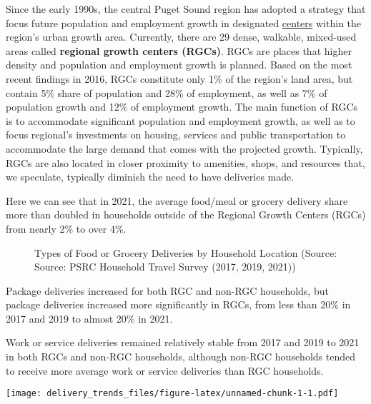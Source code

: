 \documentclass[
  11pt,
]{article}
\begin{document}
\begin{flushleft}
Since the early 1990s, the central Puget Sound region has adopted a strategy that focus future population and employment growth in designated \href{https://www.psrc.org/our-work/centers}{centers} within the region's urban growth area. Currently, there are 29 dense, walkable, mixed-used areas called  \textbf{regional growth centers (RGCs)}. RGCs are places that higher density and population and employment growth is planned. Based on the most recent findings in 2016, RGCs constitute only 1\% of the region's land area, but contain 5\% share of population and 28\% of employment, as well as 7\% of population growth and 12\% of employment growth. The main function of RGCs is to accommodate significant population and employment growth, as well as to focus regional's investments on housing, services and public transportation to accommodate the large demand that comes with the projected growth. Typically, RGCs are also located in closer proximity to amenities, shops, and resources that, we speculate, typically diminish the need to have deliveries made.

Here we can see that in 2021, the average food/meal or grocery delivery share more than doubled in households
outside of the Regional Growth Centers (RGCs) from nearly 2\% to over 4\%.
\end{flushleft}

\begin{figure}[H]
\caption{Types of Food or Grocery Deliveries by Household Location (Source: Source: PSRC Household Travel Survey (2017, 2019, 2021))}\label{fig:rgc}
\end{figure}

\begin{flushleft}
Package deliveries increased for both RGC and non-RGC households, but package deliveries increased
more significantly in RGCs, from less than 20\% in 2017 and 2019 to almost 20\% in 2021.

Work or service deliveries remained relatively stable from 2017 and 2019 to 2021 in both RGCs and non-RGC households, 
although non-RGC households tended to receive more average work or service deliveries than RGC households.
\end{flushleft}

\texttt{[image: delivery\_trends\_files/figure-latex/unnamed-chunk-1-1.pdf]}
\end{document}
